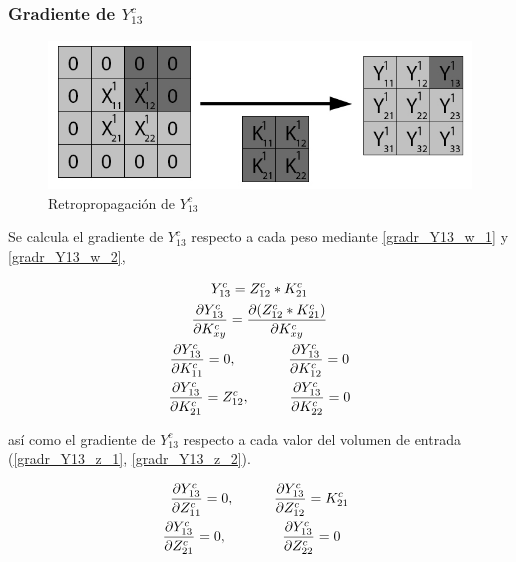\subsubsection{Gradiente de $Y^c_{13}$}

\begin{figure}[H]
	\centering
	\includegraphics[width=0.8\linewidth]{imagenes/conv_back_padding_3.jpg} 
	\caption{Retropropagación de $Y^c_{13}$}
\end{figure}

Se calcula el gradiente de $Y^c_{13}$ respecto a cada peso mediante \ref{gradr_Y13_w_1} y \ref{gradr_Y13_w_2},

\begin{gather}
	Y^c_{13} = Z^c_{12} * K^c_{21} \\
	\frac{\partial Y^c_{13}}{\partial K^c_{xy}} = \frac{\partial (Z^c_{12} * K^c_{21})}{\partial K^c_{xy}} \\
	\frac{\partial Y^c_{13}}{\partial K^c_{11}} = 0, \hspace{13mm} \frac{\partial Y^c_{13}}{\partial K^c_{12}} = 0 \label{gradr_Y13_w_1} \\
	\frac{\partial Y^c_{13}}{\partial K^c_{21}} = Z^c_{12}, \hspace{10mm} \frac{\partial Y^c_{13}}{\partial K^c_{22}} = 0
\end{gather} \label{gradr_Y13_w_2}

así como el gradiente de $Y^c_{13}$ respecto a cada valor del volumen de entrada (\ref{gradr_Y13_z_1}, \ref{gradr_Y13_z_2}).

\begin{gather}
	\frac{\partial Y^c_{13}}{\partial Z^c_{11}} = 0, \hspace{10mm} \frac{\partial Y^c_{13}}{\partial Z^c_{12}} = K^c_{21} \label{gradr_Y13_z_1} \\
	\frac{\partial Y^c_{13}}{\partial Z^c_{21}} = 0, \hspace{14mm} \frac{\partial Y^c_{13}}{\partial Z^c_{22}} = 0 \hspace{4mm} \label{gradr_Y13_z_2}
\end{gather}



